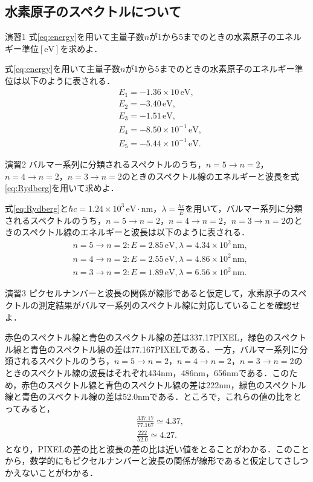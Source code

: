\documentclass[a4paper,dvipdfmx,10.5pt]{jarticle}
\begin{document}
\subsection{水素原子のスペクトルについて}
\begin{itembox}[l]{演習1}
式\eqref{eq:energy}を用いて主量子数$n$が1から5までのときの水素原子のエネルギー準位$[\text{eV}]$を求めよ．
\end{itembox}
\quad 式\eqref{eq:energy}を用いて主量子数$n$が1から5までのときの水素原子のエネルギー準位は以下のように表される．
\begin{align}
  &E_1 = -1.36 \times 10\, \text{eV},\\
  &E_2 = -3.40  \, \text{eV},\\
  &E_3 = -1.51 \, \text{eV},\\
  &E_4 = -8.50\times10^{-1} \, \text{eV},\\
  &E_5 = -5.44\times10^{-1} \, \text{eV}.
\end{align}
\begin{itembox}[l]{演習2}
バルマー系列に分類されるスペクトルのうち，$n=5\to n=2$，$n=4\to n=2$，$n=3\to n=2$のときのスペクトル線のエネルギーと波長を式\eqref{eq:Rydberg}を用いて求めよ．
\end{itembox}
\quad 式\eqref{eq:Rydberg}と$\hbar c=1.24 \times 10^3 \, \text{eV}\cdot\text{nm}$，$\lambda = \frac{\hbar c}{E}$を用いて，バルマー系列に分類されるスペクトルのうち，$n=5\to n=2$，$n=4\to n=2$，$n=3\to n=2$のときのスペクトル線のエネルギーと波長は以下のように表される．
\begin{align}
  &n=5\to n=2: E = 2.85 \, \text{eV}, \lambda = 4.34\times10^{2} \, \text{nm},\\
  &n=4\to n=2: E = 2.55 \, \text{eV}, \lambda = 4.86\times10^{2} \, \text{nm},\\
  &n=3\to n=2: E = 1.89 \, \text{eV}, \lambda = 6.56\times10^{2} \, \text{nm}.
\end{align}

\begin{itembox}[l]{演習3}
  ピクセルナンバーと波長の関係が線形であると仮定して，水素原子のスペクトルの測定結果がバルマー系列のスペクトル線に対応していることを確認せよ．
\end{itembox}
\quad  赤色のスペクトル線と青色のスペクトル線の差は337.17PIXEL，緑色のスペクトル線と青色のスペクトル線の差は77.167PIXELである．一方，バルマー系列に分類されるスペクトルのうち，$n=5\to n=2$，$n=4\to n=2$，$n=3\to n=2$のときのスペクトル線の波長はそれぞれ434nm，486nm，656nmである．このため，赤色のスペクトル線と青色のスペクトル線の差は222nm，緑色のスペクトル線と青色のスペクトル線の差は52.0nmである．ところで，これらの値の比をとってみると，
\begin{align}
  &\frac{337.17}{77.167} \simeq 4.37,\\
  &\frac{222}{52.0} \simeq 4.27.
\end{align}
となり，PIXELの差の比と波長の差の比は近い値をとることがわかる．このことから，数学的にもピクセルナンバーと波長の関係が線形であると仮定してさしつかえないことがわかる．
\end{document}
